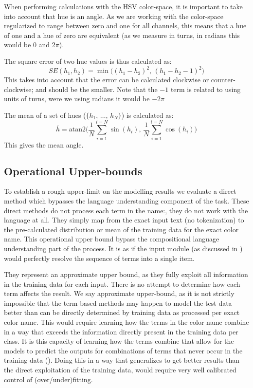 \documentclass[]{clv3}
\begin{document}
When performing calculations with the HSV color-space, it is important to take into account that hue is an angle.
As we are working with the color-space regularized to range between zero and one for all channels,
this means that a hue of one and a hue of zero are equivalent (as we measure in turns, in radians this would be $0$ and $2\pi$).

The square error of two hue values is thus calculated as:
\begin{equation}
SE(h_1, h_2) = \min \big( \left(h_1 - h_2 \right)^2, \, \left(h_1 - h_2 -1 \right)^2  \big)
\end{equation}
This takes into account that the error can be calculated clockwise or counter-clockwise; and should be the smaller.
Note that the $-1$ term is related to using units of turns, were we using radians it would be $-2\pi$


The mean of a set of hues ($\lbrace h_1,\,\ldots,\,h_N \rbrace$) is calculated as:
\begin{equation}
\bar h = \mathrm{atan2} \Bigg(%
	\frac{1}{N} \sum_{i=1}^{i=N} \sin (h_i), \,  %
	\frac{1}{N} \sum_{i=1}^{i=N} \cos (h_i)%
\Bigg)%
\end{equation}
This gives the mean angle.



\subsection{Operational Upper-bounds}
To establish a rough upper-limit on the modelling results we evaluate a direct method which bypasses the language understanding component of the task.
These direct methods do not process each term in the name:, they do not work with the language at all.
They simply map from the exact input text (no tokenization) to the pre-calculated distribution or mean of the training data for the exact color name.
This operational upper bound bypass the compositional language understanding part of the process.
It is as if the input module (as discussed in ) would perfectly resolve the sequence of terms into a single item.


They represent an approximate upper bound, as they fully exploit all information in the training data for each input.
There is no attempt to determine how each term affects the result.
We say approximate upper-bound, as it is not strictly impossible that the term-based methods may happen to model the test data better than can be directly determined by training data as processed per exact color name.
This would require learning how the terms in the color name combine in a way that exceeds the information directly present in the training data per class.
It is this capacity of learning how the terms combine that allow for the models to predict the outputs for combinations of terms that never occur in the training data ().
Doing this in a way that generalizes to get better results than the direct exploitation of the training data, would require very well calibrated control of (over/under)fitting.
\end{document}
